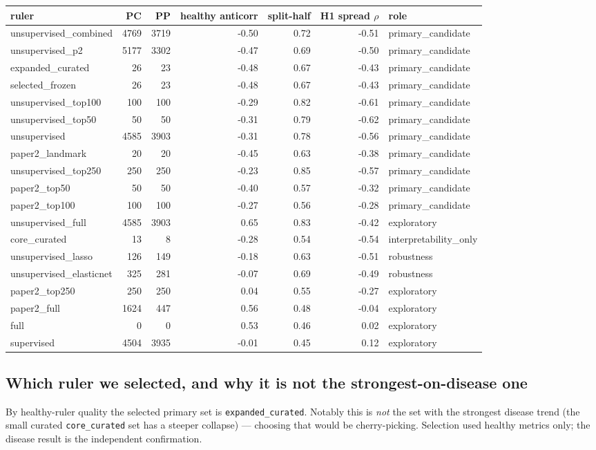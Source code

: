 \documentclass[11pt]{article}
\begin{document}
\begin{tabular}{l r r r r r l}
\hline
ruler & PC & PP & healthy anticorr & split-half & H1 spread $\rho$ & role \\
\hline
unsupervised\_combined & 4769 & 3719 & -0.50 & 0.72 & -0.51 & primary\_candidate \\
unsupervised\_p2 & 5177 & 3302 & -0.47 & 0.69 & -0.50 & primary\_candidate \\
expanded\_curated & 26 & 23 & -0.48 & 0.67 & -0.43 & primary\_candidate \\
selected\_frozen & 26 & 23 & -0.48 & 0.67 & -0.43 & primary\_candidate \\
unsupervised\_top100 & 100 & 100 & -0.29 & 0.82 & -0.61 & primary\_candidate \\
unsupervised\_top50 & 50 & 50 & -0.31 & 0.79 & -0.62 & primary\_candidate \\
unsupervised & 4585 & 3903 & -0.31 & 0.78 & -0.56 & primary\_candidate \\
paper2\_landmark & 20 & 20 & -0.45 & 0.63 & -0.38 & primary\_candidate \\
unsupervised\_top250 & 250 & 250 & -0.23 & 0.85 & -0.57 & primary\_candidate \\
paper2\_top50 & 50 & 50 & -0.40 & 0.57 & -0.32 & primary\_candidate \\
paper2\_top100 & 100 & 100 & -0.27 & 0.56 & -0.28 & primary\_candidate \\
unsupervised\_full & 4585 & 3903 & 0.65 & 0.83 & -0.42 & exploratory \\
core\_curated & 13 & 8 & -0.28 & 0.54 & -0.54 & interpretability\_only \\
unsupervised\_lasso & 126 & 149 & -0.18 & 0.63 & -0.51 & robustness \\
unsupervised\_elasticnet & 325 & 281 & -0.07 & 0.69 & -0.49 & robustness \\
paper2\_top250 & 250 & 250 & 0.04 & 0.55 & -0.27 & exploratory \\
paper2\_full & 1624 & 447 & 0.56 & 0.48 & -0.04 & exploratory \\
full & 0 & 0 & 0.53 & 0.46 & 0.02 & exploratory \\
supervised & 4504 & 3935 & -0.01 & 0.45 & 0.12 & exploratory \\
\hline
\end{tabular}

\subsection{Which ruler we selected, and why it is not the strongest-on-disease one}
By healthy-ruler quality the selected primary set is \texttt{expanded\_curated}. Notably this is \emph{not} the
set with the strongest disease trend (the small curated \texttt{core\_curated} set has a steeper collapse) ---
choosing that would be cherry-picking. Selection used healthy metrics only; the disease result is
the independent confirmation.
\end{document}
